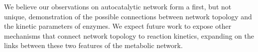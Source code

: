 \documentclass[a4page,notitlepage]{report}
\begin{document}
We believe our observations on autocatalytic network form a first, but not unique, demonstration of the possible connections between network topology and the kinetic parameters of enzymes.
We expect future work to expose other mechanisms that connect network topology to reaction kinetics, expanding on the links between these two features of the metabolic network.
{}

\end{document}
